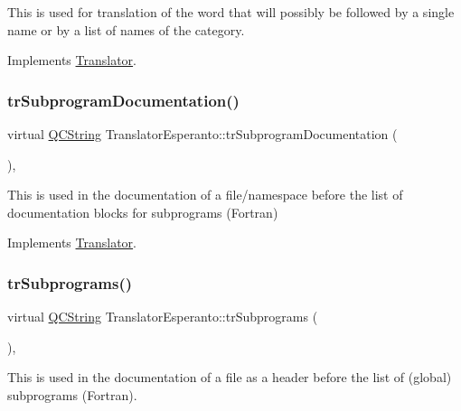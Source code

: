 This is used for translation of the word that will possibly be followed by a single name or by a list of names of the category. 

Implements \mbox{\hyperlink{class_translator}{Translator}}.

\mbox{\label{class_translator_esperanto_af23c0e2e3a44505272cb75d9cb1aa0c9}} 
\subsubsection{\texorpdfstring{trSubprogramDocumentation()}{trSubprogramDocumentation()}}
{\footnotesize\ttfamily virtual \mbox{\hyperlink{class_q_c_string}{Q\+C\+String}} Translator\+Esperanto\+::tr\+Subprogram\+Documentation (\begin{DoxyParamCaption}{ }\end{DoxyParamCaption})\hspace{0.3cm}{\ttfamily [inline]}, {\ttfamily [virtual]}}

This is used in the documentation of a file/namespace before the list of documentation blocks for subprograms (Fortran) 

Implements \mbox{\hyperlink{class_translator}{Translator}}.

\mbox{\label{class_translator_esperanto_a0ae660e142d8d6f3f5cfa32603f06cdf}} 
\subsubsection{\texorpdfstring{trSubprograms()}{trSubprograms()}}
{\footnotesize\ttfamily virtual \mbox{\hyperlink{class_q_c_string}{Q\+C\+String}} Translator\+Esperanto\+::tr\+Subprograms (\begin{DoxyParamCaption}{ }\end{DoxyParamCaption})\hspace{0.3cm}{\ttfamily [inline]}, {\ttfamily [virtual]}}

This is used in the documentation of a file as a header before the list of (global) subprograms (Fortran). 

